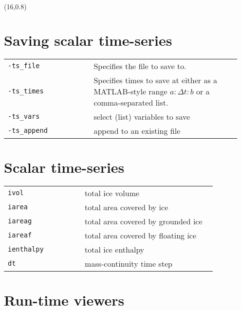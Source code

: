 \documentclass[landscape]{article}
\begin{document}
\begin{textblock}{15}(16,0.8)

\section{Saving scalar time-series}
\begin{tabular}{@{}p{0.35\linewidth}p{0.6\linewidth}@{}}
  \texttt{-ts_file} & Specifies the file to save to.\\
  \texttt{-ts_times} & Specifies times to save at either as a MATLAB-style range $a:\Delta t:b$ or a comma-separated list. \\
  \texttt{-ts_vars} & select (list) variables to save\\
  \texttt{-ts_append} & append to an existing file\\
\end{tabular}

\section{Scalar time-series}
\label{sec:scalar-time-series}

\begin{tabular}{@{}p{0.35\linewidth}p{0.6\linewidth}@{}}
\texttt{ivol} & total ice volume\\
\texttt{iarea} & total area covered by ice\\
\texttt{iareag} & total area covered by grounded ice\\
\texttt{iareaf} & total area covered by floating ice\\
\texttt{ienthalpy} & total ice enthalpy\\
\texttt{dt} & mass-continuity time step\\
\end{tabular}

\section{Run-time viewers}
\label{sec:run-time-viewers}


\end{textblock}
\end{document}
